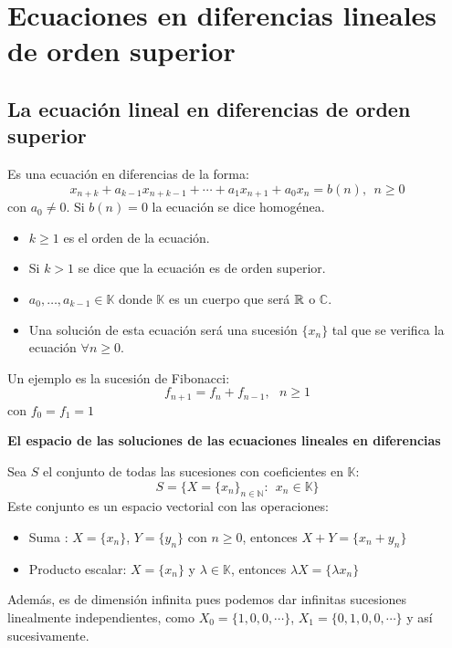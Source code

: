 \section{Ecuaciones en diferencias lineales de orden superior}
\subsection[E.D. orden superior]{La ecuación lineal en diferencias de orden superior}
\begin{ndef}
  Es una ecuación en diferencias de la forma:
  \[
    x_{n+k}+ a_{k-1}x_{n+k-1}+ \cdots + a_1 x_{n+1} + a_0 x_n = b(n), \ \ n \geq
    0
  \]
  con $a_0 \ne 0$. Si $b(n)= 0$ la ecuación se dice homogénea.

  \begin{itemize}
  \item $k \geq 1 $ es el orden de la ecuación.
  \item Si $k > 1$ se dice que la ecuación es de orden superior.
  \item $a_0,\dots,a_{k-1} \in \mathbb K $ donde $\mathbb K $ es un cuerpo que
    será $\mathbb{R} $ o $\mathbb C$.
  \item Una solución de esta ecuación será una sucesión $\{x_n\}$ tal que se
    verifica la ecuación $\forall n \geq 0$.
  \end{itemize}
\end{ndef}
\begin{ejemplo}
  Un ejemplo es la sucesión de Fibonacci:
  \[
    f_{n+1}= f_n+ f_{n-1}, \ \ \ n \geq 1
  \]
  con $f_0 = f_1 = 1$
\end{ejemplo}

\textbf{El espacio de las soluciones de las ecuaciones lineales en diferencias}

Sea $S$ el conjunto de todas las sucesiones con coeficientes en $\mathbb K$:
\[
  S= \{X=\{x_n\}_{n\in \mathbb N}: \ \ x_n \in \mathbb K\}
\]
Este conjunto es un espacio vectorial con las operaciones:
\begin{itemize}
\item Suma : $X= \{x_n\}$, $Y = \{y_n\}$ con $n\geq 0$, entonces
  $X+Y=\{x_n+y_n\}$
\item Producto escalar: $X= \{x_n\}$ y $\lambda \in \mathbb K$, entonces
  $\lambda X= \{\lambda x_n\}$
\end{itemize}
Además, es de dimensión infinita pues podemos dar infinitas sucesiones
linealmente independientes, como $X_0 = \{1, 0, 0, \cdots\}$,
$X_1=\{0,1,0,0,\cdots\}$ y así sucesivamente.

